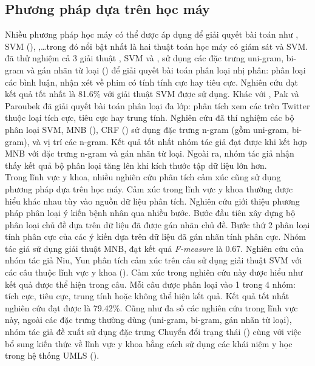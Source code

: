 \subsection{Phương pháp dựa trên học máy}
Nhiều phương pháp học máy có thể được áp dụng để giải quyết bài toán như , SVM (), ,\ldots trong đó nổi bật nhất là hai thuật toán học máy có giám sát  và SVM. \cite{pang2002thumbs} đã thử nghiệm cả 3 giải thuật , SVM và , sử dụng các đặc trưng uni-gram, bi-gram và gán nhãn từ loại () để giải quyết bài toán phân loại nhị phân: phân loại các bình luận, nhận xét về phim có tính tính cực hay tiêu cực. Nghiên cứu đạt kết quả tốt nhất là 81.6\% với giải thuật SVM được sử dụng. Khác với \cite{pang2002thumbs}, Pak và Paroubek đã giải quyết bài toán phân loại đa lớp: phân tích xem các  trên Twitter thuộc loại tích cực, tiêu cực hay trung tính. Nghiên cứu đã thí nghiệm các bộ phân loại SVM, MNB (), CRF () sử dụng đặc trưng n-gram (gồm uni-gram, bi-gram), và vị trí các n-gram. Kết quả tốt nhất nhóm tác giả đạt được khi kết hợp MNB với đặc trưng n-gram và gán nhãn từ loại. Ngoài ra, nhóm tác giả nhận thấy kết quả bộ phân loại tăng lên khi kích thước tập dữ liệu lớn hơn.\\

Trong lĩnh vực y khoa, nhiều nghiên cứu phân tích cảm xúc cũng sử dụng phương pháp dựa trên học máy. Cảm xúc trong lĩnh vực y khoa thường được hiểu khác nhau tùy vào nguồn dữ liệu phân tích.
Nghiên cứu \cite{xia09improving} giới thiệu phương pháp phân loại ý kiến bệnh nhân qua nhiều bước. Bước đầu tiên xây dựng bộ phân loại chủ đề dựa trên dữ liệu đã được gán nhãn chủ đề. Bước thứ 2 phân loại tính phân cực của các ý kiến dựa trên dữ liệu đã gán nhãn tính phân cực. Nhóm tác giả sử dụng giải thuật MNB, đạt kết quả \textit{F-measure} là 0.67.
Nghiên cứu của nhóm tác giả Niu, Yun \cite{niu2005analysis} phân tích cảm xúc trên câu sử dụng giải thuật SVM với các câu thuộc lĩnh vực y khoa (). Cảm xúc trong nghiên cứu này được hiểu như kết quả  được thể hiện trong câu. Mỗi câu được phân loại vào 1 trong 4 nhóm: tích cực, tiêu cực, trung tính hoặc không thể hiện kết quả. Kết quả tốt nhất nghiên cứu đạt được là 79.42\%. Cũng như đa số các nghiên cứu trong lĩnh vực này, ngoài các đặc trưng thường dùng (uni-gram, bi-gram, gán nhãn từ loại), nhóm tác giả đề xuất sử dụng đặc trưng Chuyển đổi trạng thái () cùng với việc bổ sung kiến thức về lĩnh vực y khoa bằng cách sử dụng các khái niệm y học trong hệ thống UMLS (). 

